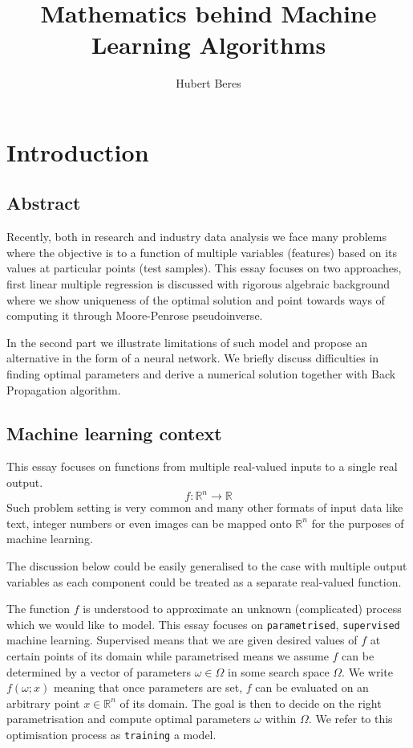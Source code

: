 \documentclass[a4paper,11pt]{article}
\title{Mathematics behind Machine Learning Algorithms}
\author{Hubert Beres}
\theoremstyle{break}
\newcommand{\R}{\mathbb{R}}
\begin{document}
\maketitle

\section{Introduction}

\subsection{Abstract}

Recently, both in research and industry data analysis we face many problems where the objective is to  a function of multiple variables (features) based on its values at particular points (test samples). This essay focuses on two approaches, first linear multiple regression is discussed with rigorous algebraic background where we show uniqueness of the optimal solution and point towards ways of computing it through Moore-Penrose pseudoinverse.

In the second part we illustrate limitations of such model and propose an alternative in the form of a neural network. We briefly discuss difficulties in finding optimal parameters and derive a numerical solution together with Back Propagation algorithm.

\subsection{Machine learning context}

This essay focuses on functions from multiple real-valued inputs to a single real output.
$$ f : \R^n \to \R $$
Such problem setting is very common and many other formats of input data like text, integer numbers or even images can be mapped onto $\R^n$ for the purposes of machine learning.

The discussion below could be easily generalised to the case with multiple output variables as each component could be treated as a separate real-valued function.

The function $f$ is understood to approximate an unknown (complicated) process which we would like to model.
This essay focuses on {\tt parametrised}, {\tt supervised} machine learning.
Supervised means that we are given desired values of $f$ at certain points of its domain while parametrised means we assume $f$ can be determined by a vector of parameters $ \omega \in \Omega$ in some search space $\Omega$.
We write $ f(\omega; x) $ meaning that once parameters are set, $f$ can be evaluated on an arbitrary point $x \in \R^n$ of its domain.
The goal is then to decide on the right parametrisation and compute optimal parameters $\omega$ within $\Omega$. We refer to this optimisation process as {\tt training} a model.
\end{document}
